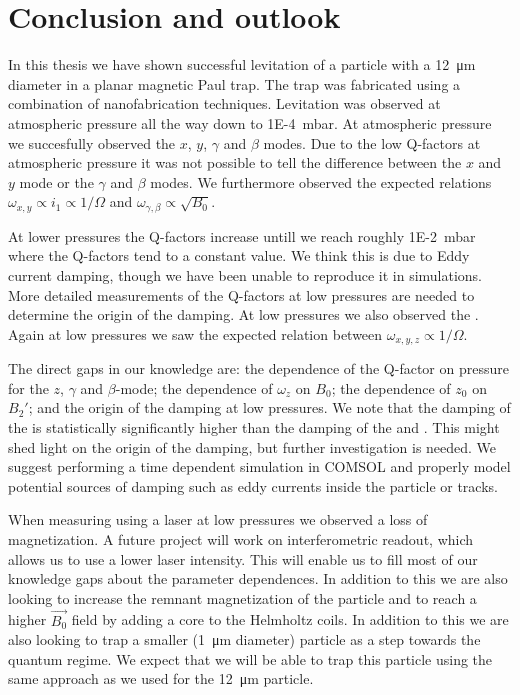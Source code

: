 \chapter{Conclusion and outlook}
\label{chap:conclusion}
In this thesis we have shown successful levitation of a  particle with a \qty{12}{\micro\meter} diameter in a planar magnetic Paul trap. The trap was fabricated using a combination of nanofabrication techniques. Levitation was observed at atmospheric pressure all the way down to \qty{1E-4}{\milli\bar}. At atmospheric pressure we succesfully observed the $x$, $y$, $\gamma$ and $\beta$ modes. Due to the low Q-factors at atmospheric pressure it was not possible to tell the difference between the $x$ and $y$ mode or the $\gamma$ and $\beta$ modes. We furthermore observed the expected relations $\omega_{x,y} \propto i_1 \propto 1/\Omega$ and $\omega_{\gamma,\beta} \propto \sqrt{B_0}$.

At lower pressures the Q-factors increase untill we reach roughly \qty{1E-2}{\milli\bar} where the Q-factors tend to a constant value. We think this is due to Eddy current damping, though we have been unable to reproduce it in simulations. More detailed measurements of the Q-factors at low pressures are needed to determine the origin of the damping. At low pressures we also observed the \zmode. Again at low pressures we saw the expected relation between $\omega_{x,y,z} \propto 1/\Omega$.

The direct gaps in our knowledge are: the dependence of the Q-factor on pressure for the $z$, $\gamma$ and $\beta$-mode; the dependence of $\omega_z$ on $B_0$; the dependence of $z_0$ on $B_2'$; and the origin of the damping at low pressures. We note that the damping of the \zmode is statistically significantly higher than the damping of the \xmode and \ymode. This might shed light on the origin of the damping, but further investigation is needed. We suggest performing a time dependent simulation in COMSOL and properly model potential sources of damping such as eddy currents inside the particle or tracks.

When measuring using a laser at low pressures we observed a loss of magnetization. A future project will work on interferometric readout, which allows us to use a lower laser intensity. This will enable us to fill most of our knowledge gaps about the parameter dependences. In addition to this we are also looking to increase the remnant magnetization of the particle and to reach a higher $\vec{B_0}$ field by adding a core to the Helmholtz coils. In addition to this we are also looking to trap a smaller (\qty{1}{\micro\meter} diameter) particle as a step towards the quantum regime. We expect that we will be able to trap this particle using the same approach as we used for the \qty{12}{\micro\meter} particle.

